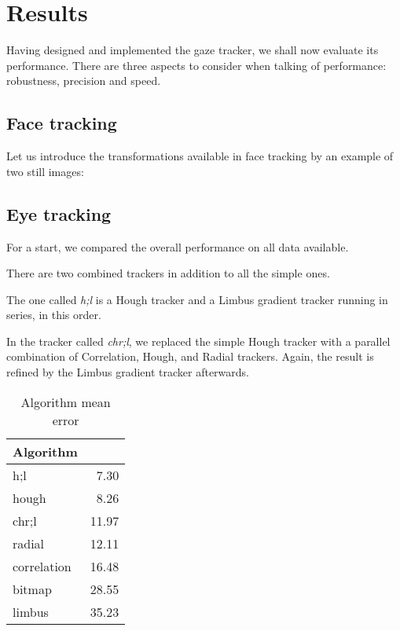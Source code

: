 \chapter{Results}

Having designed and implemented the gaze tracker, we shall now evaluate its performance.
There are three aspects to consider when talking of performance: robustness, precision and speed.

\section{Face tracking}
Let us introduce the transformations available in face tracking by an example of two still images:


\section{Eye tracking}

For a start, we compared the overall performance on all data available.

There are two combined trackers in addition to all the simple ones.

The one called \textit{h;l} is a Hough tracker and a Limbus gradient tracker running in series, in this order.

In the tracker called \textit{chr;l}, we replaced the simple Hough tracker with a parallel combination of Correlation, Hough, and Radial trackers.
Again, the result is refined by the Limbus gradient tracker afterwards.

\begin{table}[h]
\centering
\begin{tabular}{l@{\hspace{1.5cm}}D{.}{.}{3.2}}
\toprule
\textbf{Algorithm} &  \\
\midrule
h;l & 7.30 \\
hough & 8.26 \\
chr;l & 11.97 \\
radial & 12.11 \\
correlation & 16.48 \\
bitmap & 28.55 \\
limbus & 35.23 \\
\bottomrule
\end{tabular}
\caption{Algorithm mean error}\label{t:algo-mean}
\end{table}

